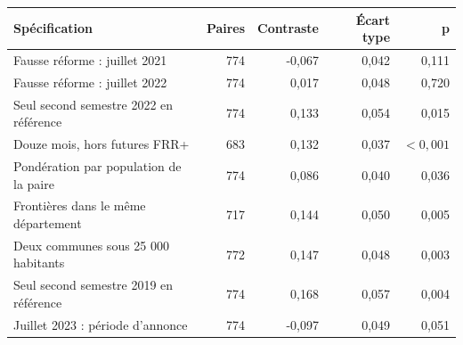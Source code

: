 \begin{tabularx}{\linewidth}{Xrrrr}
\toprule
Spécification & Paires & Contraste & Écart type & p \\
\midrule
Fausse réforme : juillet 2021 & 774 & -0,067 & 0,042 & 0,111 \\
Fausse réforme : juillet 2022 & 774 & 0,017 & 0,048 & 0,720 \\
Seul second semestre 2022 en référence & 774 & 0,133 & 0,054 & 0,015 \\
Douze mois, hors futures FRR+ & 683 & 0,132 & 0,037 & $<0{,}001$ \\
Pondération par population de la paire & 774 & 0,086 & 0,040 & 0,036 \\
Frontières dans le même département & 717 & 0,144 & 0,050 & 0,005 \\
Deux communes sous 25 000 habitants & 772 & 0,147 & 0,048 & 0,003 \\
Seul second semestre 2019 en référence & 774 & 0,168 & 0,057 & 0,004 \\
Juillet 2023 : période d’annonce & 774 & -0,097 & 0,049 & 0,051 \\
\bottomrule
\end{tabularx}

